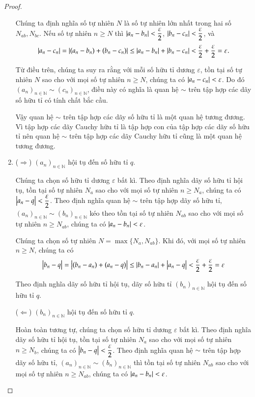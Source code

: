 \begin{proof}
\begin{enumerate}[label={(\roman*)},itemsep=0pt]
              Chúng ta định nghĩa số tự nhiên $N$ là số tự nhiên lớn nhất trong hai số $N_{ab}, N_{bc}$. Nếu số tự nhiên $n\geq N$ thì $\left\vert{a_{n} - b_{n}}\right\vert < \dfrac{\varepsilon}{2}$, $\left\vert{b_{n} - c_{n}}\right\vert < \dfrac{\varepsilon}{2}$, và
              \[
                  \left\vert{a_{n} - c_{n}}\right\vert = \left\vert{(a_{n} - b_{n}) + (b_{n} - c_{n})}\right\vert \leq \left\vert{a_{n} - b_{n}}\right\vert + \left\vert{b_{n} - c_{n}}\right\vert < \dfrac{\varepsilon}{2} + \dfrac{\varepsilon}{2} = \varepsilon.
              \]

              Từ điều trên, chúng ta suy ra rằng với mỗi số hữu tỉ dương $\varepsilon$, tồn tại số tự nhiên $N$ sao cho với mọi số tự nhiên $n\geq N$, chúng ta có $ \left\vert{a_{n} - c_{n}}\right\vert < \varepsilon$. Do đó ${(a_{n})}_{n\in\mathbb{N}} \sim {(c_{n})}_{n\in\mathbb{N}}$, điều này có nghĩa là quan hệ $\sim$ trên tập hợp các dãy số hữu tỉ có tính chất bắc cầu.

              Vậy quan hệ $\sim$ trên tập hợp các dãy số hữu tỉ là một quan hệ tương đương. Vì tập hợp các dãy Cauchy hữu tỉ là tập hợp con của tập hợp các dãy số hữu tỉ nên quan hệ $\sim$ trên tập hợp các dãy Cauchy hữu tỉ cũng là một quan hệ tương đương.
        \item ($\Rightarrow$) ${(a_{n})}_{n\in\mathbb{N}}$ hội tụ đến số hữu tỉ $q$.

              Chúng ta chọn số hữu tỉ dương $\varepsilon$ bất kì. Theo định nghĩa dãy số hữu tỉ hội tụ, tồn tại số tự nhiên $N_{a}$ sao cho với mọi số tự nhiên $n\geq N_{a}$, chúng ta có $\left\vert{a_{n} - q}\right\vert < \dfrac{\varepsilon}{2}$. Theo định nghĩa quan hệ $\sim$ trên tập hợp dãy số hữu tỉ, ${(a_{n})}_{n\in\mathbb{N}}\sim {(b_{n})}_{n\in\mathbb{N}}$ kéo theo tồn tại số tự nhiên $N_{ab}$ sao cho với mọi số tự nhiên $n\geq N_{ab}$, chúng ta có $\left\vert{a_{n} - b_{n}}\right\vert < \varepsilon$.

              Chúng ta chọn số tự nhiên $N = \max\{ N_{a}, N_{ab} \}$. Khi đó, với mọi số tự nhiên $n\geq N$, chúng ta có
              \[
                  \left\vert{b_{n} - q}\right\vert = \left\vert{(b_{n} - a_{n}) + (a_{n} - q)}\right\vert \leq \left\vert{b_{n} - a_{n}}\right\vert + \left\vert{a_{n} - q}\right\vert < \frac{\varepsilon}{2} + \frac{\varepsilon}{2} = \varepsilon
              \]

              Theo định nghĩa dãy số hữu tỉ hội tụ, dãy số hữu tỉ ${(b_{n})}_{n\in\mathbb{N}}$ hội tụ đến số hữu tỉ $q$.

              ($\Leftarrow$) ${(b_{n})}_{n\in\mathbb{N}}$ hội tụ đến số hữu tỉ $q$.

              Hoàn toàn tương tự, chúng ta chọn số hữu tỉ dương $\varepsilon$ bất kì. Theo định nghĩa dãy số hữu tỉ hội tụ, tồn tại số tự nhiên $N_{a}$ sao cho với mọi số tự nhiên $n\geq N_{b}$, chúng ta có $\left\vert{b_{n} - q}\right\vert < \dfrac{\varepsilon}{2}$. Theo định nghĩa quan hệ $\sim$ trên tập hợp dãy số hữu tỉ, ${(a_{n})}_{n\in\mathbb{N}}\sim {(b_{n})}_{n\in\mathbb{N}}$ thì tồn tại số tự nhiên $N_{ab}$ sao cho với mọi số tự nhiên $n\geq N_{ab}$, chúng ta có $\left\vert{a_{n} - b_{n}}\right\vert < \varepsilon$.


\end{enumerate}
\end{proof}
